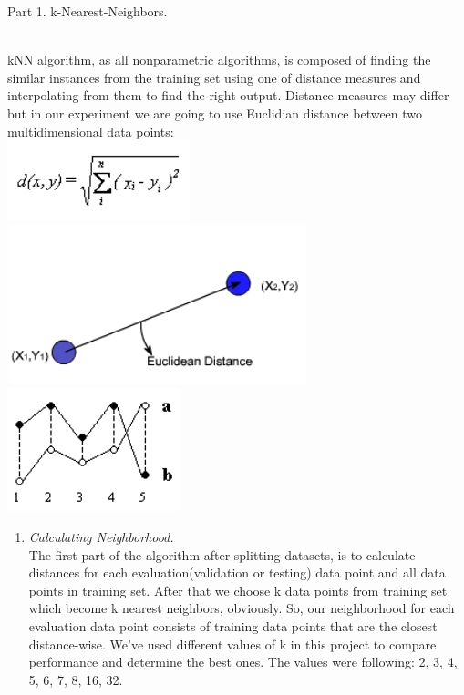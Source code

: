 \documentclass[12pt, letterpaper]{article}
\begin{document}
\begin{enumerate}[label=\Roman*.]
	{\bf \item Part 1. k-Nearest-Neighbors. }\\
	
	kNN algorithm, as all nonparametric algorithms, is composed of finding the similar instances from the training set using one of distance measures and interpolating from them to find the right output. Distance measures may differ but in our experiment we are going to use Euclidian distance between two multidimensional data points:\\
	\includegraphics[scale=0.7]{../images/d1.png} 
	\includegraphics[scale=0.5]{../images/d2.png} 
	\includegraphics[scale=0.7]{../images/d3.png} \\
	
	\begin{enumerate}[label=\arabic*.]

	\item {\it Calculating Neighborhood. }\\
	The first part of the algorithm after splitting datasets, is to calculate distances for each evaluation(validation or testing) data point and all data points in training set. After that we choose k data points from training set which become k nearest neighbors, obviously. So, our neighborhood for each evaluation data point consists of training data points that are the closest distance-wise. We've used different values of k in this project to compare performance and determine the best ones. The values were following: 2, 3, 4, 5, 6, 7, 8, 16, 32.\\
	

\end{enumerate}
\end{enumerate}
\end{document}
